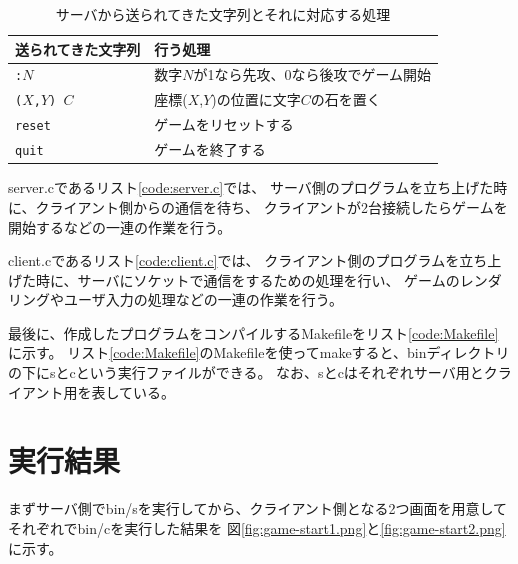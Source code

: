 \documentclass[a4j, titlepage, 10pt]{jsarticle}
\newcommand{\code}[1]{\texttt{#1}}
\begin{document}
\begin{table}[H]
  \centering
  \caption{サーバから送られてきた文字列とそれに対応する処理}
  \label{tab:mapping-received-str-and-corresponding-process}
  \begin{tabular}{ll} \toprule
    送られてきた文字列 & 行う処理 \\
    \midrule
    \code{:$N$} & 数字$N$が1なら先攻、0なら後攻でゲーム開始 \\
    \code{($X$,$Y$) $C$} & 座標($X$,$Y$)の位置に文字$C$の石を置く \\
    \code{reset} & ゲームをリセットする \\
    \code{quit} & ゲームを終了する \\
    \bottomrule
  \end{tabular}
\end{table}

server.cであるリスト\ref{code:server.c}では、
サーバ側のプログラムを立ち上げた時に、クライアント側からの通信を待ち、
クライアントが2台接続したらゲームを開始するなどの一連の作業を行う。

\lstset{ numbers = left }


client.cであるリスト\ref{code:client.c}では、
クライアント側のプログラムを立ち上げた時に、サーバにソケットで通信をするための処理を行い、
ゲームのレンダリングやユーザ入力の処理などの一連の作業を行う。

\lstset{ numbers = left }


最後に、作成したプログラムをコンパイルするMakefileをリスト\ref{code:Makefile}に示す。
リスト\ref{code:Makefile}のMakefileを使ってmakeすると、binディレクトリの下にsとcという実行ファイルができる。
なお、sとcはそれぞれサーバ用とクライアント用を表している。

\lstset{ numbers = left }



\section{実行結果}

まずサーバ側でbin/sを実行してから、クライアント側となる2つ画面を用意してそれぞれでbin/cを実行した結果を
図\ref{fig:game-start1.png}と\ref{fig:game-start2.png}に示す。

\end{document}
